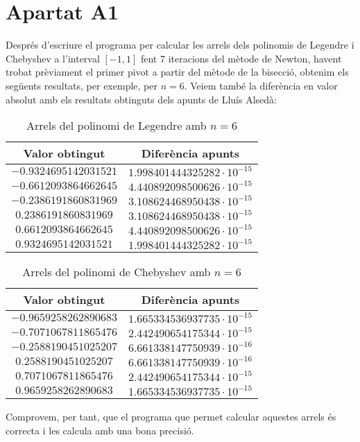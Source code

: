 \documentclass[a4paper,11pt]{article}
\begin{document}
\section*{Apartat A1}
Després d'escriure el programa per calcular les arrels dels polinomis de Legendre i Chebyshev a l'interval $[-1, 1]$ fent 7 iteracions del mètode de Newton, havent trobat prèviament el primer pivot a partir del mètode de la bisecció, obtenim els següents resultats, per exemple\footnotemark, per $n = 6$. Veiem també la diferència en valor absolut amb els resultats obtinguts dels apunts de Lluís Alsedà:
\begin{table}[H]
\centering
  \begin{tabular}{cc}
    Valor obtingut & Diferència apunts\\
    \toprule
    $-0.9324695142031521$ & $1.998401444325282 \cdot 10^{-15}$\\
    \midrule
    $-0.6612093864662645$ & $4.440892098500626 \cdot 10^{-15}$\\
    \midrule
    $-0.2386191860831969$ & $3.108624468950438 \cdot 10^{-15}$\\
    \midrule
    $0.2386191860831969$ & $3.108624468950438 \cdot 10^{-15}$\\
    \midrule
    $0.6612093864662645$ & $4.440892098500626 \cdot 10^{-15}$\\
    \midrule
    $0.9324695142031521$ & $1.998401444325282 \cdot 10^{-15}$\\
    \bottomrule
  \end{tabular}
  \caption{Arrels del polinomi de Legendre amb $n = 6$}
\end{table}
\begin{table}[H]
\centering
\begin{tabular}{cc}
    Valor obtingut & Diferència apunts\\
    \toprule
    $-0.9659258262890683$ & $1.665334536937735 \cdot 10^{-15}$\\
    \midrule
    $-0.7071067811865476$ & $2.442490654175344 \cdot 10^{-15}$\\
    \midrule
    $-0.2588190451025207$ & $6.661338147750939 \cdot 10^{-16}$\\
    \midrule
    $0.2588190451025207$ & $6.661338147750939 \cdot 10^{-16}$\\
    \midrule
    $0.7071067811865476$ & $2.442490654175344 \cdot 10^{-15}$\\
    \midrule
    $0.9659258262890683$ & $1.665334536937735 \cdot 10^{-15}$\\
    \bottomrule
  \end{tabular}
  \caption{Arrels del polinomi de Chebyshev amb $n = 6$}
\end{table}
Comprovem, per tant, que el programa que permet calcular aquestes arrels és correcta i les calcula amb una bona precisió.
\clearpage
\end{document}
